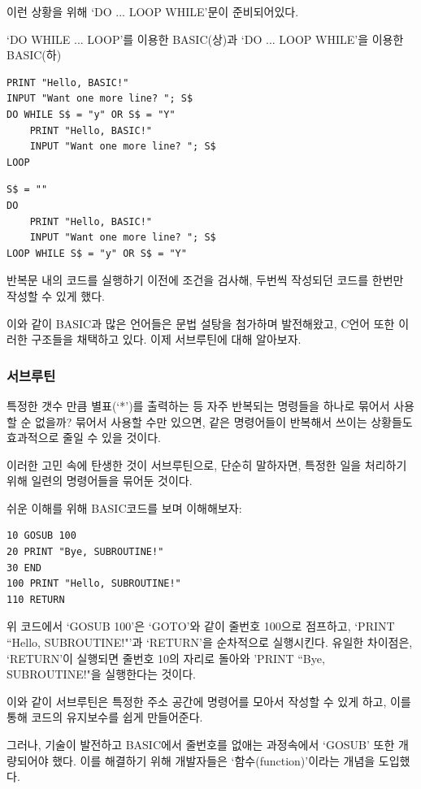 \documentclass{article}
\begin{document}
이런 상황을 위해 `DO ... LOOP WHILE'문이 준비되어있다.



`DO WHILE ... LOOP'를 이용한 BASIC(상)과 `DO ... LOOP WHILE'을 이용한 BASIC(하)

\begin{lstlisting}
PRINT "Hello, BASIC!"
INPUT "Want one more line? "; S$
DO WHILE S$ = "y" OR S$ = "Y"
    PRINT "Hello, BASIC!"
    INPUT "Want one more line? "; S$
LOOP
\end{lstlisting}
\begin{lstlisting}
S$ = ""
DO
    PRINT "Hello, BASIC!"
    INPUT "Want one more line? "; S$
LOOP WHILE S$ = "y" OR S$ = "Y"
\end{lstlisting}


반복문 내의 코드를 실행하기 이전에 조건을 검사해, 두번씩 작성되던 코드를 한번만 작성할 수 있게 했다.

이와 같이 BASIC과 많은 언어들은 문법 설탕을 첨가하며 발전해왔고, C언어 또한 이러한 구조들을 채택하고 있다.
이제 서브루틴에 대해 알아보자.



\subsubsection{서브루틴}

특정한 갯수 만큼 별표(`*')를 출력하는 등 자주 반복되는 명령들을 하나로 묶어서 사용할 순 없을까?
묶어서 사용할 수만 있으면, 같은 명령어들이 반복해서 쓰이는 상황들도 효과적으로 줄일 수 있을 것이다.

이러한 고민 속에 탄생한 것이 서브루틴으로,
단순히 말하자면, 특정한 일을 처리하기 위해 일련의 명령어들을 묶어둔 것이다.

쉬운 이해를 위해 BASIC코드를 보며 이해해보자:

\begin{lstlisting}
10 GOSUB 100
20 PRINT "Bye, SUBROUTINE!"
30 END
100 PRINT "Hello, SUBROUTINE!"
110 RETURN
\end{lstlisting}

위 코드에서 `GOSUB 100'은 `GOTO'와 같이 줄번호 100으로 점프하고,
`PRINT ``Hello, SUBROUTINE!"'과 `RETURN'을 순차적으로 실행시킨다.
유일한 차이점은, `RETURN'이 실행되면 줄번호 10의 자리로 돌아와
'PRINT ``Bye, SUBROUTINE!"을 실행한다는 것이다.

이와 같이 서브루틴은 특정한 주소 공간에 명령어를 모아서 작성할 수 있게 하고,
이를 통해 코드의 유지보수를 쉽게 만들어준다.

그러나, 기술이 발전하고 BASIC에서 줄번호를 없애는 과정속에서 `GOSUB' 또한 개량되어야 했다.
이를 해결하기 위해 개발자들은 `함수(function)'이라는 개념을 도입했다.
\end{document}
